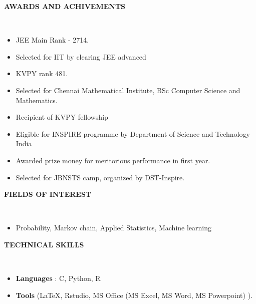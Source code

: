 \documentclass[a4paper,10pt]{article}
\newcommand{\lsep}{-0.5cm}
\newcommand{\resheading}[1]{{\small \colorbox{mygrey}{\begin{minipage}{0.975\textwidth}{\textbf{#1 \vphantom{p\^{E}}}}\end{minipage}}}}
\begin{document}
\resheading{\textbf{AWARDS AND ACHIVEMENTS} }\\[\lsep]
\begin{itemize}
\item \noindent JEE Main Rank - 2714.
\item \noindent Selected for IIT by clearing JEE advanced
\item \noindent KVPY rank 481.
\item \noindent Selected for Chennai Mathematical Institute, BSc Computer Science and Mathematics.
\item \noindent Recipient of KVPY fellowship
\item \noindent Eligible for INSPIRE programme by Department of Science and Technology India
\item \noindent Awarded prize money for meritorious performance in first year.
\item \noindent Selected for JBNSTS camp, organized by DST-Inspire.
\end{itemize}

\resheading{\textbf{FIELDS OF INTEREST} }\\[\lsep]
\begin{itemize}
\item \noindent Probability, Markov chain, Applied Statistics, Machine learning
\end{itemize}

\resheading{\textbf{TECHNICAL SKILLS} }\\[\lsep]
\begin{itemize}
\item \noindent \textbf{Languages} : C, Python, R 
\item \noindent \textbf{Tools} (\LaTeX, Rstudio, MS Office (MS Excel, MS Word, MS Powerpoint) ).
\end{itemize}
\end{document}
